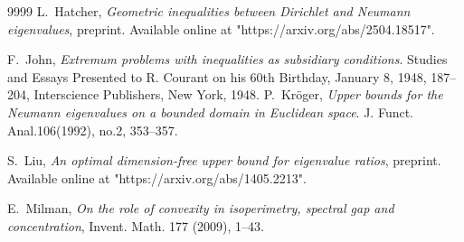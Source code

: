 \documentclass[12pt]{amsart}
\theoremstyle{plain}
\theoremstyle{remark}
\begin{document}
\begin{thebibliography}{9999}
L.~Hatcher, \textit{Geometric inequalities between Dirichlet and Neumann eigenvalues}, preprint. Available online at "https://arxiv.org/abs/2504.18517".

F.~John, \textit{Extremum problems with inequalities as subsidiary conditions}. Studies and Essays Presented to R. Courant on his 60th Birthday, January 8, 1948, 187--204, Interscience Publishers, New York, 1948.
P.~Kr\"{o}ger, \textit{Upper bounds for the Neumann eigenvalues on a bounded domain in Euclidean space}. J. Funct. Anal.106(1992), no.2, 353--357.

S.~Liu, \textit{An optimal dimension-free upper bound for eigenvalue ratios}, preprint. Available online at "https://arxiv.org/abs/1405.2213".



E.~Milman, \textit{On the role of convexity in isoperimetry, spectral gap and concentration}, Invent. Math. 177 (2009), 1--43.



\end{thebibliography}
\end{document}
